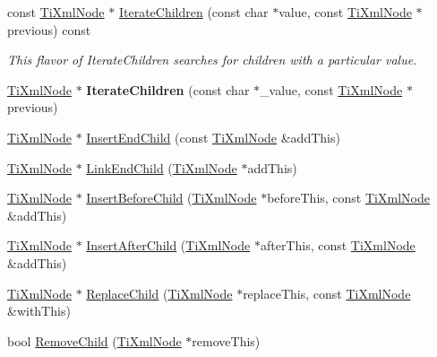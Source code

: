 \begin{DoxyCompactItemize}
\item 
const \hyperlink{classTiXmlNode}{Ti\+Xml\+Node} $\ast$ \hyperlink{classTiXmlNode_af2b86dbe25d3d26fa48180edc5e2a9fc}{Iterate\+Children} (const char $\ast$value, const \hyperlink{classTiXmlNode}{Ti\+Xml\+Node} $\ast$previous) const \hypertarget{classTiXmlNode_af2b86dbe25d3d26fa48180edc5e2a9fc}{}\label{classTiXmlNode_af2b86dbe25d3d26fa48180edc5e2a9fc}

\begin{DoxyCompactList}\small\item\em This flavor of Iterate\+Children searches for children with a particular \textquotesingle{}value\textquotesingle{}. \end{DoxyCompactList}\item 
\hyperlink{classTiXmlNode}{Ti\+Xml\+Node} $\ast$ {\bfseries Iterate\+Children} (const char $\ast$\+\_\+value, const \hyperlink{classTiXmlNode}{Ti\+Xml\+Node} $\ast$previous)\hypertarget{classTiXmlNode_a67ba8275e533e6f76340236c42ea0aea}{}\label{classTiXmlNode_a67ba8275e533e6f76340236c42ea0aea}

\item 
\hyperlink{classTiXmlNode}{Ti\+Xml\+Node} $\ast$ \hyperlink{classTiXmlNode_af287a913ce46d8dbf7ef24fec69bbaf0}{Insert\+End\+Child} (const \hyperlink{classTiXmlNode}{Ti\+Xml\+Node} \&add\+This)
\item 
\hyperlink{classTiXmlNode}{Ti\+Xml\+Node} $\ast$ \hyperlink{classTiXmlNode_a1a881212554b759865f6cac79a851d38}{Link\+End\+Child} (\hyperlink{classTiXmlNode}{Ti\+Xml\+Node} $\ast$add\+This)
\item 
\hyperlink{classTiXmlNode}{Ti\+Xml\+Node} $\ast$ \hyperlink{classTiXmlNode_a71e54e393336382bc9875f64aab5cb15}{Insert\+Before\+Child} (\hyperlink{classTiXmlNode}{Ti\+Xml\+Node} $\ast$before\+This, const \hyperlink{classTiXmlNode}{Ti\+Xml\+Node} \&add\+This)
\item 
\hyperlink{classTiXmlNode}{Ti\+Xml\+Node} $\ast$ \hyperlink{classTiXmlNode_a274db3292218202805c093f66a964cb5}{Insert\+After\+Child} (\hyperlink{classTiXmlNode}{Ti\+Xml\+Node} $\ast$after\+This, const \hyperlink{classTiXmlNode}{Ti\+Xml\+Node} \&add\+This)
\item 
\hyperlink{classTiXmlNode}{Ti\+Xml\+Node} $\ast$ \hyperlink{classTiXmlNode_a543208c2c801c84a213529541e904b9f}{Replace\+Child} (\hyperlink{classTiXmlNode}{Ti\+Xml\+Node} $\ast$replace\+This, const \hyperlink{classTiXmlNode}{Ti\+Xml\+Node} \&with\+This)
\item 
bool \hyperlink{classTiXmlNode_ae19d8510efc90596552f4feeac9a8fbf}{Remove\+Child} (\hyperlink{classTiXmlNode}{Ti\+Xml\+Node} $\ast$remove\+This)\hypertarget{classTiXmlNode_ae19d8510efc90596552f4feeac9a8fbf}{}\label{classTiXmlNode_ae19d8510efc90596552f4feeac9a8fbf}


\end{DoxyCompactItemize}

